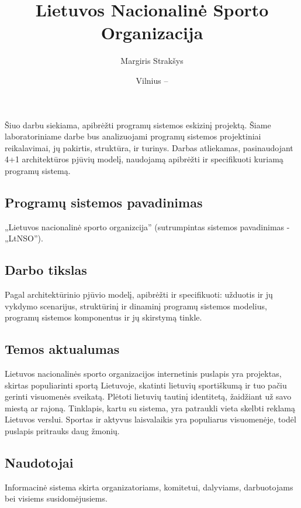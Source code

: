 \documentclass{VUMIFPSkursinis}
\title{Lietuvos Nacionalinė Sporto Organizacija }
\author{Margiris Strakšys}
\date{Vilnius – \the\year}
\begin{document}
    \maketitle
    \tableofcontents
	
     \label{anotacija}
        Šiuo darbu siekiama, apibrėžti programų sistemos eskizinį projektą.
		Šiame laboratoriniame darbe bus analizuojami programų sistemos projektiniai reikalavimai, jų pakirtis, struktūra, ir turinys.
		Darbas atliekamas, pasinaudojant 4+1 architektūros pjūvių modelį, naudojamą apibrėžti ir specifikuoti kuriamą programų sistemą.
		
     \label{ivadas}
        \subsection*{Programų sistemos pavadinimas} \label{ivadas_pavadinimas}
			„Lietuvos nacionalinė sporto organizcija” (sutrumpintas sistemos pavadinimas - „LtNSO”).

		\subsection*{Darbo tikslas} \label{ivadas_tikslas}
			Pagal architektūrinio pjūvio modelį, apibrėžti ir specifikuoti: užduotis ir jų vykdymo scenarijus, struktūrinį ir dinaminį programų sistemos modelius, programų sistemos komponentus ir jų skirstymą tinkle.
		
		\subsection*{Temos aktualumas} \label{ivadas_aktualumas}
			Lietuvos nacionalinės sporto organizacijos internetinis puslapis yra projektas, skirtas populiarinti sportą Lietuvoje, skatinti lietuvių sportiškumą ir tuo pačiu gerinti visuomenės sveikatą.
			Plėtoti lietuvių tautinį identitetą, žaidžiant už savo miestą ar rajoną. 
			Tinklapis, kartu su sistema, yra patraukli vieta skelbti reklamą Lietuvos verslui. 
			Sportas ir aktyvus laisvalaikis yra populiarus visuomenėje, todėl puslapis pritrauks daug žmonių.
		
		\subsection*{Naudotojai} \label{ivadas_naudotojai}
			Informacinė sistema skirta organizatoriams, komitetui, dalyviams, darbuotojams bei visiems susidomėjusiems.
\end{document}

